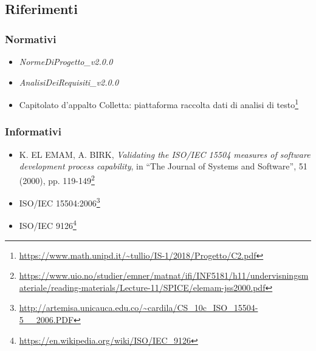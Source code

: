 \subsection{Riferimenti}
\subsubsection{Normativi}
\begin{itemize}
\item \textit{NormeDiProgetto\_v2.0.0}
\item \textit{AnalisiDeiRequisiti\_v2.0.0}
\item Capitolato d'appalto Colletta: piattaforma raccolta dati di analisi di testo\footnote{\url{https://www.math.unipd.it/~tullio/IS-1/2018/Progetto/C2.pdf}}
\end{itemize}
\subsubsection{Informativi}
\begin{itemize}
	\item K. EL EMAM, A. BIRK, \textit{Validating the ISO/IEC 15504 measures of software development process capability}, in \enquote{The Journal of Systems and Software}, 51 (2000), pp. 119-149\footnote{\url{https://www.uio.no/studier/emner/matnat/ifi/INF5181/h11/undervisningsmateriale/reading-materials/Lecture-11/SPICE/elemam-jss2000.pdf}}
	\item ISO/IEC 15504:2006\footnote{\url{http://artemisa.unicauca.edu.co/~cardila/CS\_10c\_ISO\_15504-5\_\_2006.PDF}}
	\item ISO/IEC 9126\footnote{\url{https://en.wikipedia.org/wiki/ISO/IEC_9126}}
\end{itemize} 
